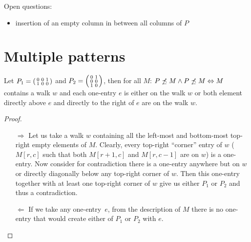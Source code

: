 Open questions:
\begin{itemize}
\item insertion of an empty column in between all columns of $P$
\end{itemize}

\section{Multiple patterns}
\begin{thm}
Let $P_1=\left(\begin{smallmatrix}0&0&1\\1&0&0\end{smallmatrix}\right)$ and $P_2=\left(\begin{smallmatrix}0&1\\0&0\\1&0\end{smallmatrix}\right)$, then for all $M$: $P\not\preceq M\wedge P\not\preceq M\Leftrightarrow M$ contains a walk $w$ and each one-entry $e$ is either on the walk $w$ or both element directly above $e$ and directly to the right of $e$ are on the walk $w$.
\begin{proof}
\begin{itemize}
\item[$\Rightarrow$] Let us take a walk $w$ containing all the left-most and bottom-most top-right empty elements of $M$. Clearly, every top-right ``corner'' entry of $w$ ($M[r,c]$ such that both $M[r+1,c]$ and $M[r,c-1]$ are on $w$) is a one-entry. Now consider for contradiction there is a one-entry anywhere but on $w$ or directly diagonally below any top-right corner of $w$. Then this one-entry together with at least one top-right corner of $w$ give us either $P_1$ or $P_2$ and thus a contradiction.
\item[$\Leftarrow$] If we take any one-entry~$e$, from the description of $M$ there is no one-entry that would create either of $P_1$ or $P_2$ with $e$.
\end{itemize}
\end{proof}
\end{thm}